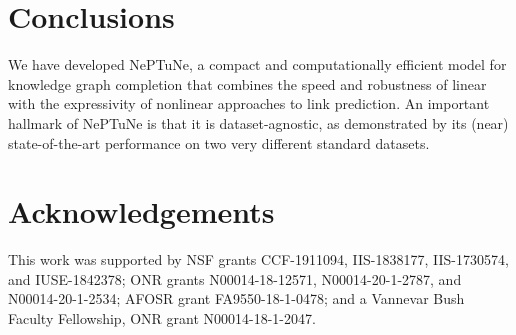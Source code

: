 \documentclass[11pt]{article}
\begin{document}
\section{Conclusions} 

We have developed NePTuNe, a compact and computationally efficient model for knowledge graph completion that combines the speed and robustness of linear with the expressivity of nonlinear approaches to link prediction.
An important hallmark of NePTuNe is that it is dataset-agnostic, as demonstrated by its  (near) state-of-the-art performance on two very different standard datasets.





\section*{Acknowledgements}

This work was supported by NSF grants CCF-1911094, IIS-1838177, IIS-1730574, and IUSE-1842378; ONR grants N00014-18-12571, N00014-20-1-2787, and N00014-20-1-2534; AFOSR grant FA9550-18-1-0478; and a Vannevar Bush Faculty Fellowship, ONR grant N00014-18-1-2047.






\end{document}
